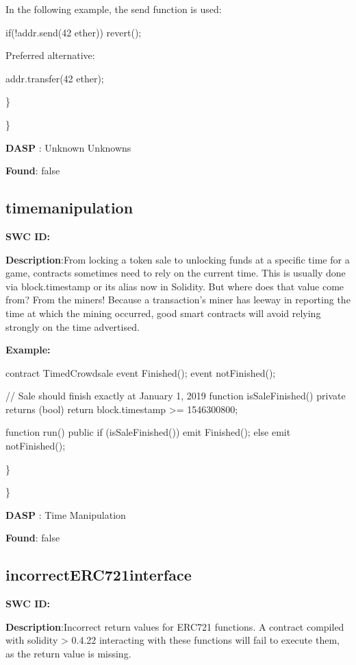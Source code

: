 \documentclass{article}
\begin{document}
{{In the following example, the send function is used:


if(!addr.send(42 ether)) {
    revert();
}

Preferred alternative:

addr.transfer(42 ether);

\} 

\} 

\textbf{DASP} : Unknown Unknowns

\textbf{Found}: false

\subsection{time\textunderscore manipulation} 
\textbf{SWC \textunderscore ID:} 

\textbf{Description}:From locking a token sale to unlocking funds at a specific time for a game, contracts sometimes need to rely on the current time. This is usually done via block.timestamp or its alias now in Solidity. But where does that value come from? From the miners! Because a transaction's miner has leeway in reporting the time at which the mining occurred, good smart contracts will avoid relying strongly on the time advertised.


\textbf{Example:} 

contract TimedCrowdsale
  event Finished();
  event notFinished();

  // Sale should finish exactly at January 1, 2019
  function isSaleFinished() private returns (bool) {
    return block.timestamp >= 1546300800;
  }

  function run() public {
    if (isSaleFinished()) {
        emit Finished();
    } else {
        emit notFinished();
    }
  }
}

\} 

\} 

\textbf{DASP} : Time Manipulation

\textbf{Found}: false

\subsection{incorrect\textunderscore ERC721\textunderscore interface} 
\textbf{SWC \textunderscore ID:} 

\textbf{Description}:Incorrect return values for ERC721 functions. A contract compiled with solidity > 0.4.22 interacting with these functions will fail to execute them, as the return value is missing.


}
\end{document}
